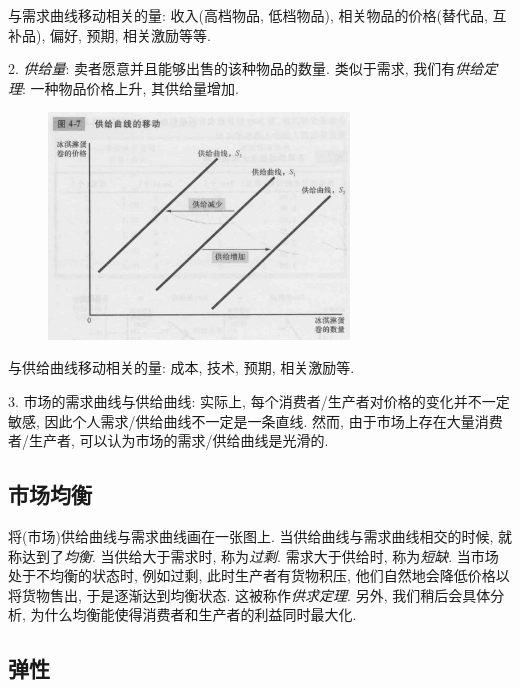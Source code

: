 与需求曲线移动相关的量: 收入(高档物品, 低档物品), 相关物品的价格(替代品, 互补品), 偏好, 预期, 相关激励等等. 

2. \textit{供给量}: 卖者愿意并且能够出售的该种物品的数量. 类似于需求, 我们有\textit{供给定理}: 一种物品价格上升, 其供给量增加. 

\begin{figure}[H]
	\centering
	\includegraphics[width=8cm]{attachment/Fig4_7.png}
\end{figure}

与供给曲线移动相关的量: 成本, 技术, 预期, 相关激励等. 

3. 市场的需求曲线与供给曲线: 实际上, 每个消费者/生产者对价格的变化并不一定敏感, 因此个人需求/供给曲线不一定是一条直线. 然而, 由于市场上存在大量消费者/生产者, 可以认为市场的需求/供给曲线是光滑的. 

\subsection{市场均衡}

将(市场)供给曲线与需求曲线画在一张图上. 当供给曲线与需求曲线相交的时候, 就称达到了\textit{均衡}. 当供给大于需求时, 称为\textit{过剩}. 需求大于供给时, 称为\textit{短缺}. 当市场处于不均衡的状态时, 例如过剩, 此时生产者有货物积压, 他们自然地会降低价格以将货物售出, 于是逐渐达到均衡状态. 这被称作\textit{供求定理}. 另外, 我们稍后会具体分析, 为什么均衡能使得消费者和生产者的利益同时最大化. 



\subsection{弹性}



